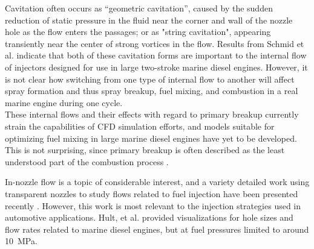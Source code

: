 \documentclass[letterpaper,twocolumn,10pt]{ilass}
\begin{document}


Cavitation often occurs as ``geometric cavitation'', caused by the sudden reduction of
static pressure in the fluid near the corner and wall of the nozzle hole as the flow
enters the passages; or as "string cavitation", appearing transiently near the center of
strong vortices in the flow\cite{Andriotis2008}.
%
Results from Schmid et al. indicate that both of these cavitation forms are important to the
internal flow of injectors designed for use in large two-stroke marine diesel engines.
However, it is not clear how switching from one type of internal flow to another will affect
spray formation and thus spray breakup, fuel mixing, and combustion in a real marine engine
during one cycle.\\
%
These internal flows and their effects with regard to primary breakup currently
strain the capabilities of CFD simulation efforts, and models suitable for optimizing
fuel mixing in large marine diesel engines have yet to be developed. 
%
This is not surprising, since primary breakup is often described as the least understood part of the combustion process \cite{Fansler2015,Linne2013}.

%
In-nozzle flow is a topic of considerable interest, and a variety detailed work using transparent nozzles to study flows related to fuel injection have been presented recently
\cite{Fansler2015, Blessing2003, Duke2014}.
However, this work is most relevant to the injection strategies used in automotive applications.
Hult, et al.\cite{Hult2016} provided visualizations for hole sizes and flow rates related to marine diesel engines, but at fuel pressures limited to around 10~MPa.
\end{document}

